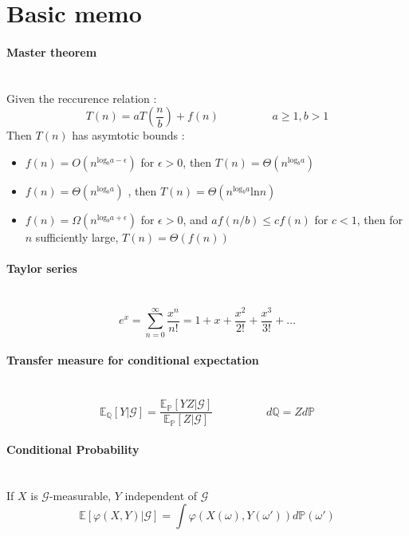 \documentclass[a4paper,10pt]{article}
\begin{document}
\begin{center}\end{center}
\section{Basic memo}
\paragraph{Master theorem}~\cite{CORMEN2009}\mbox{} \\
Given the reccurence relation :
\[
T(n)=aT(\frac{n}{b}) + f(n) \hspace{2cm}  a\geq 1 , b > 1
\]
Then $T(n)$ has asymtotic bounds :
\begin{itemize}
	\item $f(n)=O(n^{\text{log}_ba-\epsilon})$ for $\epsilon>0$, then $T(n)=\Theta(n^{\text{log}_ba})$
	\item  $f(n)=\Theta(n^{\text{log}_ba})$ , then $T(n)=\Theta(n^{\text{log}_ba}\text{ln}n)$
	\item  $f(n)=\Omega(n^{\text{log}_ba+\epsilon})$ for $\epsilon>0$, and $af(n/b)\leq cf(n)$ for $c<1$, then for $n$ sufficiently large, $T(n)=\Theta(f(n))$
\end{itemize}
\paragraph{Taylor series}\mbox{} \\
\[
e^x=\sum_{n=0}^{\infty} \frac{x^n}{n!}=1+x+\frac{x^2}{2!}+\frac{x^3}{3!}+\ldots
\]

\paragraph{Transfer measure for conditional expectation}\mbox{} \\
\[
\mathbb{E}_{\mathbb{Q}}[Y|\mathcal{G}] = 
\frac{\mathbb{E}_{\mathbb{P}}[YZ|\mathcal{G}]}{\mathbb{E}_{\mathbb{P}}[Z|\mathcal{G}]}
\hspace{2cm}
d\mathbb{Q} = Z d\mathbb{P}
\]

\paragraph{Conditional Probability}\mbox{} \\
If $X$ is $\mathcal{G}$-measurable, $Y$ independent of $\mathcal{G}$
\[
\mathbb{E}[\varphi(X,Y)|\mathcal{G}] = \int \varphi(X(\omega),Y(\omega '))d\mathbb{P}(\omega ')
\]
\end{document}
